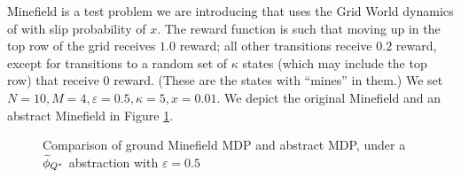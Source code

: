 Minefield is a test problem we are introducing that uses the Grid World dynamics of \citet{russell1995modern} with slip probability of $x$. The reward function is such that moving up in the top row of the grid receives $1.0$ reward; all other transitions receive $0.2$ reward, except for transitions to a random set of $\kappa$ states (which may include the top row) that receive $0$ reward. (These are the states with ``mines'' in them.) We set $N=10, M=4, \varepsilon=0.5, \kappa = 5, x = 0.01$. We depict the original Minefield and an abstract Minefield in Figure \ref{fig:minefield-vis}.

\begin{figure}
\centering
{}
\caption{Comparison of ground Minefield \ac{MDP} and abstract \ac{MDP}, under a $\widetilde \phi_{Q^*}$ abstraction with $
\varepsilon=0.5$}
\label{fig:minefield-vis}
\end{figure} 

